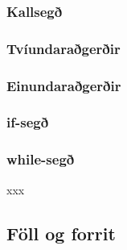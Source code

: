 \documentclass[12pt,a4paper]{article}
\begin{document}
\subsubsection{Kallsegð}
\subsubsection{Tvíundaraðgerðir}
\subsubsection{Einundaraðgerðir}
\subsubsection{if-segð}
\subsubsection{while-segð}
xxx
\subsection{Föll og forrit}
\end{document}
